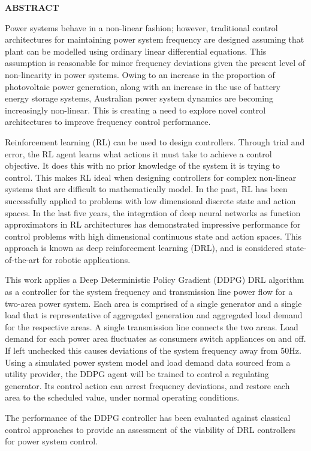 \begin{center}
\large \textbf{ABSTRACT}
\end{center}

Power systems behave in a non-linear fashion; however, traditional control architectures for maintaining power system frequency are designed assuming that plant can be modelled using ordinary linear differential equations. This assumption is reasonable for minor frequency deviations given the present level of non-linearity in power systems. Owing to an increase in the proportion of photovoltaic power generation, along with an increase in the use of battery energy storage systems, Australian power system dynamics are becoming increasingly non-linear. This is creating a need to explore novel control architectures to improve frequency control performance.

Reinforcement learning (RL) can be used to design controllers. Through trial and error, the RL agent learns what actions it must take to achieve a control objective. It does this with no prior knowledge of the system it is trying to control. This makes RL ideal when designing controllers for complex non-linear systems that are difficult to mathematically model. In the past, RL has been successfully applied to problems with low dimensional discrete state and action spaces. In the last five years, the integration of deep neural networks as function approximators in RL architectures has demonstrated impressive performance for control problems with high dimensional continuous state and action spaces. This approach is known as deep reinforcement learning (DRL), and is considered state-of-the-art for robotic applications.

This work applies a Deep Deterministic Policy Gradient (DDPG) DRL algorithm as a controller for the system frequency and transmission line power flow for a two-area power system. Each area is comprised of a single generator and a single load that is representative of aggregated generation and aggregated load demand for the respective areas. A single transmission line connects the two areas. Load demand for each power area fluctuates as consumers switch appliances on and off. If left unchecked this causes deviations of the system frequency away from 50$\si{\hertz}$. Using a simulated power system model and load demand data sourced from a utility provider, the DDPG agent will be trained to control a regulating generator. Its control action can arrest frequency deviations, and restore each area to the scheduled value, under normal operating conditions.

The performance of the DDPG controller has been evaluated against classical control approaches to provide an assessment of the viability of DRL controllers for power system control.